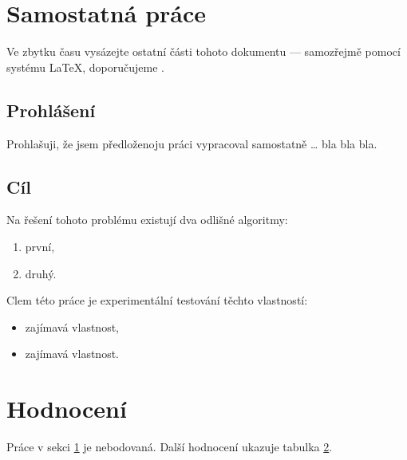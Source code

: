 \documentclass{article}
\begin{document}
\clearpage

\section{Samostatná práce} \label{sec:prace}
Ve zbytku času vysázejte ostatní části tohoto dokumentu --- samozřejmě
pomocí systému \LaTeX, doporučujeme \XeLaTeX.

\subsection{Prohlášení}
Prohlašuji, že jsem předloženoju práci vypracoval samostatně \dots{} bla
bla bla.

\subsection{Cíl}
Na řešení tohoto problému existují dva odlišné algoritmy:
\begin{enumerate}
    \item první,
    \item druhý.
\end{enumerate}

\noindent Clem \cite{guide} této práce je experimentální testování těchto vlastností:
\begin{itemize}
         \item zajímavá vlastnost,
         \item zajímavá vlastnost.
\end{itemize}

\section{Hodnocení}
Práce v sekci \ref{sec:prace} je nebodovaná. Další hodnocení ukazuje
tabulka \ref{}.
\begin{landscape}
\begin{table}[h!]\centering
{}
    \caption{Bodované činnosti v předmětu BI-DPR}
    \label{tab:bodovane-cinnosti}
    
\end{table}
\end{landscape}
\end{document}
